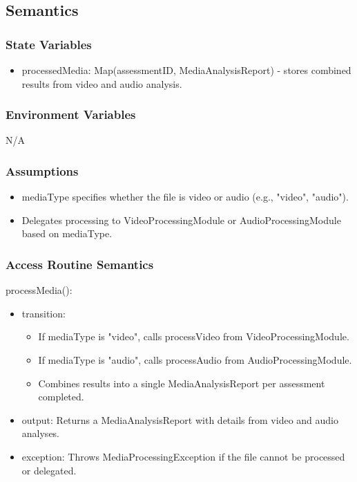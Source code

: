 \documentclass[12pt, titlepage]{article}
\begin{document}
\subsection{Semantics}

\subsubsection{State Variables}
\begin{itemize}
\item processedMedia: Map(assessmentID, MediaAnalysisReport) - stores combined results from video and audio analysis.
\end{itemize}

\subsubsection{Environment Variables}
N/A

\subsubsection{Assumptions}
\begin{itemize}
\item mediaType specifies whether the file is video or audio (e.g., "video", "audio").
\item Delegates processing to VideoProcessingModule or AudioProcessingModule based on mediaType.
\end{itemize}

\subsubsection{Access Routine Semantics}

\noindent processMedia():
\begin{itemize}
\item transition:
\begin{itemize}
\item If mediaType is "video", calls processVideo from VideoProcessingModule.
\item If mediaType is "audio", calls processAudio from AudioProcessingModule.
\item Combines results into a single MediaAnalysisReport per assessment completed.
\end{itemize}
\item output: Returns a MediaAnalysisReport with details from video and audio analyses.
\item exception: Throws MediaProcessingException if the file cannot be processed or delegated.
\end{itemize}
\end{document}
